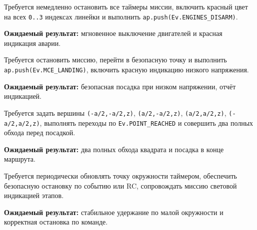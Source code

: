 \begin{taskbox}
Требуется немедленно остановить все таймеры миссии, включить красный цвет на всех \texttt{0..3} индексах линейки и выполнить \texttt{ap.push(Ev.ENGINES\_DISARM)}.

\textbf{Ожидаемый результат:} мгновенное выключение двигателей и красная индикация аварии.
\end{taskbox}

\begin{taskbox}
Требуется остановить миссию, перейти в безопасную точку и выполнить \texttt{ap.push(Ev.MCE\_LANDING)}, включить красную индикацию низкого напряжения.

\textbf{Ожидаемый результат:} безопасная посадка при низком напряжении, отчёт индикацией.
\end{taskbox}

\begin{taskbox}
Требуется задать вершины \texttt{(-a/2,-a/2,z)}, \texttt{(a/2,-a/2,z)}, \texttt{(a/2,a/2,z)}, \texttt{(-a/2,a/2,z)}, выполнять переходы по \texttt{Ev.POINT\_REACHED} и совершить два полных обхода перед посадкой.

\textbf{Ожидаемый результат:} два полных обхода квадрата и посадка в конце маршрута.
\end{taskbox}

\begin{taskbox}[«Лоитер» по малой окружности \texttt{r=0.2}]
Требуется периодически обновлять точку окружности таймером, обеспечить безопасную остановку по событию или RC, сопровождать миссию световой индикацией этапов.

\textbf{Ожидаемый результат:} стабильное удержание по малой окружности и корректная остановка по команде.
\end{taskbox}

